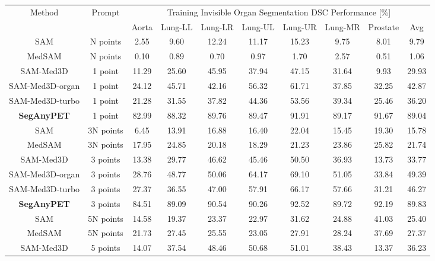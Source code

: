 
\begin{table*}[t]
	\centering
    \normalsize
    \setlength\tabcolsep{5pt}
	\renewcommand\arraystretch{1.15}
	\begin{tabular}{c|c|ccccccc|c}
		\hline 	\hline
		\multirow{2}{*}{Method}  &  \multirow{2}{*}{Prompt} & \multicolumn{8}{c}{Training Invisible Organ Segmentation DSC Performance [\%]}  \\
\cline{3-10}  && Aorta & Lung-LL & Lung-LR & Lung-UL & Lung-UR & Lung-MR & Prostate & Avg  \\ \hline
SAM  \cite{SAM} & N points & 2.55 & 9.60 & 12.24 & 11.17 & 15.23 & 9.75 & 8.01 & 9.79 \\
MedSAM  \cite{MedSAM} & N points & 0.10 & 0.89 & 0.70 & 0.97 & 1.70 & 2.57 & 0.51 & 1.06  \\
SAM-Med3D \cite{SAM-Med3D} & 1 point & 11.29 & 25.60 & 45.95 & 37.94 & 47.15 & 31.64 & 9.93 & 29.93 \\
SAM-Med3D-organ & 1 point & 24.12 & 45.71 & 42.16 & 56.32 & 61.71 & 37.85 & 32.25 & 42.87  \\
SAM-Med3D-turbo & 1 point & 21.28 & 31.55 & 37.82 & 44.36 & 53.56 & 39.34 & 25.46 & 36.20 \\ \hline
\rowcolor{gray!25} \textbf{SegAnyPET}  & 1 point & 82.99 & 88.32 & 89.76 & 89.47 & 91.91 & 89.17 & 91.67 & 89.04 \\ \hline
SAM  \cite{SAM} & 3N points & 6.45 & 13.91 & 16.88 & 16.40 & 22.04 & 15.45 & 19.30 & 15.78 \\
MedSAM  \cite{MedSAM} & 3N points & 17.95 & 24.85 & 20.18 & 18.29 & 21.23 & 23.86 & 25.82 & 21.74 \\
SAM-Med3D \cite{SAM-Med3D} & 3 points & 13.38 & 29.77 & 46.62 & 45.46 & 50.50 & 36.93 & 13.73 & 33.77 \\
SAM-Med3D-organ & 3 points & 28.76 & 48.77 & 50.06 & 64.17 & 69.10 & 51.05 & 33.84 & 49.39 \\
SAM-Med3D-turbo & 3 points & 27.37 & 36.55 & 47.00 & 57.91 & 66.17 & 57.66 & 31.21 & 46.27 \\ \hline
\rowcolor{gray!25} \textbf{SegAnyPET}  & 3 points & 84.51 & 89.09 & 90.54 & 90.26 & 92.52 & 89.72 & 92.19 & 89.83 \\ \hline
SAM  \cite{SAM} & 5N points & 14.58 & 19.37 & 23.37 & 22.97 & 31.62 & 24.88 & 41.03 & 25.40 \\
MedSAM  \cite{MedSAM} & 5N points & 21.73 & 27.45 & 25.55 & 23.05 & 27.91 & 28.24 & 37.69 & 27.37 \\
SAM-Med3D \cite{SAM-Med3D} & 5 points & 14.07 & 37.54 & 48.46 & 50.68 & 51.01 & 38.43 & 13.37 & 36.23 \\

\end{tabular}
\end{table*}
